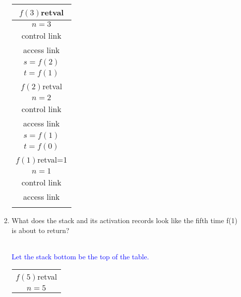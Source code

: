 \documentclass[10pt]{article}
\begin{document}
\begin{enumerate}
\begin{enumerate}
{\begin{tabular}{|c|}
                    \hline
                    $f(3)$retval   \\
                    \hline
                    $n=3$          \\
                    \hline
                    control link   \\
                    \hline
                    access link    \\
                    \hline
                    $s=f(2)$       \\
                    \hline
                    $t=f(1)$       \\
                    \hline
                    $f(2)$retval   \\
                    \hline
                    $n=2$          \\
                    \hline
                    control link   \\
                    \hline
                    access link    \\
                    \hline
                    $s=f(1)$       \\
                    \hline
                    $t=f(0)$       \\
                    \hline
                    $f(1)$retval=1 \\
                    \hline
                    $n=1$          \\
                    \hline
                    control link   \\
                    \hline
                    access link    \\
                    \hline
                    \\
                  \end{tabular}
                }
          \item What does the stack and its activation records look like the fifth time f(1) is about to return?
                \textcolor{blue}{\\
                  Let the stack bottom be the top of the table.\\
                  \begin{tabular}{|c|}
                    \hline
                    \hline
                    \\
                    \hline
                    $f(5)$retval   \\
                    \hline
                    $n=5$          \\

\end{tabular}}
\end{enumerate}
\end{enumerate}
\end{document}
